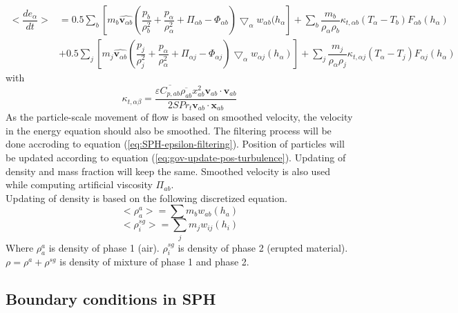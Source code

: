 \documentclass[10pt,a4paper]{article}
\begin{document}
\begin{equation}
\begin{split}
<\dfrac{d e_{\alpha}}{d t}>
& = 0.5\sum_b [m_b \widehat{\textbf{v}_{\alpha b}} (\dfrac{p_b}{\rho_b^2} + \dfrac{p_{\alpha}}{\rho_{\alpha}^2} + \Pi_{\alpha b} - \Phi_{\alpha b}) \bigtriangledown_{\alpha}w_{\alpha b}(h_{\alpha}] 
 + \sum_b \dfrac{m_b}{\rho_{\alpha} \rho_b} \kappa_{t,\alpha b} (T_{\alpha} - T_b) F_{\alpha b} (h_{\alpha}) \\
 & +0.5\sum_j [m_j \widehat{\textbf{v}_{\alpha b}}(\dfrac{p_j}{\rho_j^2} + \dfrac{p_{\alpha}}{\rho_{\alpha}^2} + \Pi_{\alpha j} - \Phi_{\alpha j}) \bigtriangledown_{\alpha}w_{\alpha j}(h_{\alpha})]
 +\sum_j \dfrac{m_j}{\rho_{\alpha} \rho_j} \kappa_{t,\alpha j} (T_{\alpha} - T_j) F_{\alpha j} (h_{\alpha})
\end{split}
\label{eq:gov-sph-e}
\end{equation}
with
\begin{equation}
\kappa_{t,\alpha \beta} = \dfrac{\varepsilon \overline{C_{p,ab}} \overline{\rho_{ab}} x_{ab}^2 \textbf{v}_{ab} \cdot \textbf{v}_{ab}}{2 S Pr_t\textbf{v}_{ab} \cdot \textbf{x}_{ab}}
\end{equation}
As the particle-scale movement of flow is based on smoothed velocity, the velocity in the energy equation should also be smoothed.
The filtering process will be done accroding to equation (\ref{eq:SPH-epsilon-filtering}). Position of particles will be updated according to equation (\ref{eq:gov-update-pos-turbulence}). Updating of density and mass fraction will keep the same. Smoothed velocity is also used while computing artificial viscosity $\Pi_{ab}$.\\
Updating of density is based on the following discretized equation.
\begin{equation}
<\rho_a^a>=\sum m_b w_{ab} (h_a) \label{eq:gov-sph-d1}
\end{equation}
\begin{equation}
<\rho_i^{sg}>=\sum_j m_j w_{ij} (h_i) \label{eq:gov-sph-d2}
\end{equation}
Where
$\rho_a^a$ is density of phase 1 (air).
$\rho_i^{sg}$ is density of phase 2 (erupted material).
$\rho=\rho^a + \rho^{sg}$ is density of mixture of phase 1 and phase 2.
\subsection{Boundary conditions in SPH}
\end{document}
